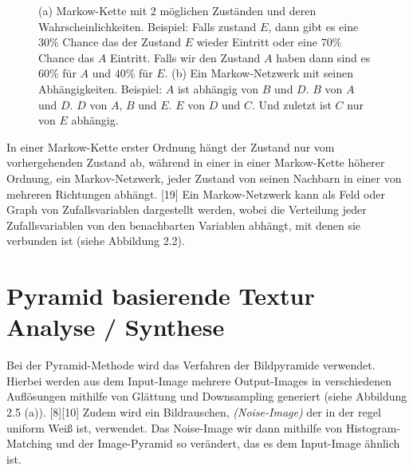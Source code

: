 \documentclass[12pt]{report}
\begin{document}
\begin{figure}[H]
    \centering
    \qquad
    \caption{(a) Markow-Kette mit 2 möglichen Zuständen und deren Wahrscheinlichkeiten.
    Beispiel: Falls zustand $E$, dann gibt es eine $30\%$ Chance das der Zustand $E$ wieder Eintritt oder eine $70\%$ Chance das $A$ Eintritt.
    Falls wir den Zustand $A$ haben dann sind es $60\%$ für $A$ und $40\%$ für $E$. (b) Ein Markow-Netzwerk mit seinen Abhängigkeiten.
    Beispiel: $A$ ist abhängig von $B$ und $D$. $B$ von $A$ und $D$. $D$ von $A$, $B$ und $E$. $E$ von $D$ und $C$. Und zuletzt ist $C$ nur von $E$ abhängig.}%
\end{figure}

In einer Markow-Kette erster Ordnung hängt der Zustand nur vom vorhergehenden Zustand ab,
während in einer in einer Markow-Kette höherer Ordnung, ein Markov-Netzwerk, jeder Zustand von seinen Nachbarn in einer von mehreren Richtungen abhängt. {[19]}
Ein Markow-Netzwerk kann als Feld oder Graph von Zufallsvariablen dargestellt werden,
wobei die Verteilung jeder Zufallsvariablen von den benachbarten Variablen abhängt, mit denen sie verbunden ist {(siehe Abbildung 2.2)}.

\section{Pyramid basierende Textur Analyse / Synthese}

Bei der Pyramid-Methode wird das Verfahren der Bildpyramide verwendet.
Hierbei werden aus dem Input-Image mehrere Output-Images in verschiedenen Auflösungen mithilfe von Glättung und Downsampling generiert {(siehe Abbildung 2.5 (a))}. {[8][10]}
\newline
Zudem wird ein Bildrauschen, \textit{(Noise-Image)} der in der regel uniform Weiß ist, verwendet.
Das Noise-Image wir dann mithilfe von Histogram-Matching und der Image-Pyramid so verändert, das es dem Input-Image ähnlich ist.
\end{document}
